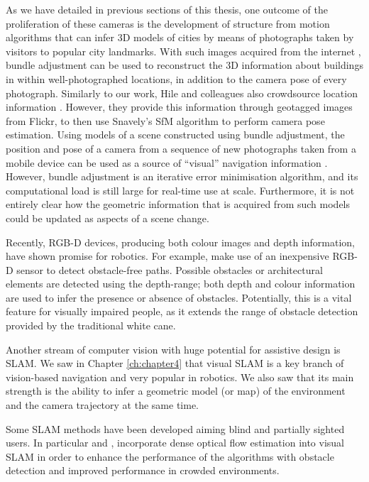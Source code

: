 As we have detailed in previous sections of this thesis, one outcome of the proliferation of these cameras is the development of structure from motion algorithms that can infer 3D models of cities \citep{agarwal2011building} by means of photographs taken by visitors to popular city landmarks. With such images acquired from the internet \citep{snavely2006photo}, bundle adjustment can be used to reconstruct the 3D information about buildings in within well-photographed locations, in addition to the camera pose of every photograph. Similarly to our work, Hile and colleagues also crowdsource location information \citep{hile2010visual}. However, they provide this information through geotagged images from Flickr, to then use Snavely's SfM algorithm \citep{snavely2006photo} to perform camera pose estimation. Using models of a scene constructed using bundle adjustment, the position and pose of a camera from a sequence of new photographs taken from a mobile device can be used as a source of ``visual'' navigation information \citep{ventura2014global}.  However, bundle adjustment is an iterative error minimisation algorithm, and its computational load is still large for real-time use at scale.  Furthermore, it is not entirely clear how the geometric information that is acquired from such models could be updated as aspects of a scene change.

Recently, RGB-D devices, producing both colour images and depth information, have shown promise for robotics. For example, \citet{aladren2014navigation} make use of an inexpensive RGB-D sensor to detect obstacle-free paths. Possible obstacles or architectural elements are detected using the depth-range; both depth and colour information are used to infer the presence or absence of obstacles. Potentially, this is a vital feature for visually impaired people, as it extends the range of obstacle detection provided by the traditional white cane.


Another stream of computer vision with huge potential for assistive design is SLAM. We saw in Chapter \ref{ch:chapter4} that visual SLAM is a key branch of vision-based navigation and very popular in robotics. We also saw that its main strength is the ability to infer a geometric model (or map) of the environment and the camera trajectory at the same time. 

Some SLAM methods have been developed aiming blind and partially sighted users. In particular \cite{alcantarilla2010visual} and \cite{alcantarilla2012combining}, incorporate dense optical flow estimation into visual SLAM in order to enhance the performance of the algorithms with obstacle detection and improved performance in crowded environments.

